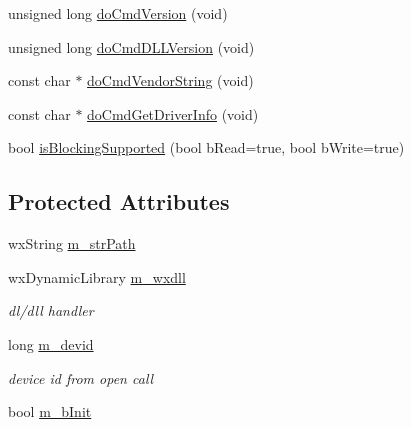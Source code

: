 \begin{DoxyCompactItemize}
unsigned long \hyperlink{class_c_dll_wrapper_a23f350d95cd15e82cd60cdddb90c3361}{doCmdVersion} (void)
\item 
unsigned long \hyperlink{class_c_dll_wrapper_ab2f4f9d4d403ee847442826234caf9d6}{doCmdDLLVersion} (void)
\item 
const char $\ast$ \hyperlink{class_c_dll_wrapper_a1d4f5113557b340ab21680376e76205e}{doCmdVendorString} (void)
\item 
const char $\ast$ \hyperlink{class_c_dll_wrapper_a74cef360f4a9e071260cd28f6dc92c69}{doCmdGetDriverInfo} (void)
\item 
bool \hyperlink{class_c_dll_wrapper_a504043dc80bfb6163cecbe0e2a0c48e1}{isBlockingSupported} (bool bRead=true, bool bWrite=true)
\end{DoxyCompactItemize}
\subsection*{Protected Attributes}
\begin{DoxyCompactItemize}
\item 
wxString \hyperlink{class_c_dll_wrapper_a07a318919ee7a2b0d6332bea947e4576}{m\_\-strPath}
\item 
\hypertarget{class_c_dll_wrapper_a07171bd633843c72899987d1e6a54ee3}{
wxDynamicLibrary \hyperlink{class_c_dll_wrapper_a07171bd633843c72899987d1e6a54ee3}{m\_\-wxdll}}
\label{de/d52/class_c_dll_wrapper_a07171bd633843c72899987d1e6a54ee3}

\begin{DoxyCompactList}\small\item\em dl/dll handler \end{DoxyCompactList}\item 
\hypertarget{class_c_dll_wrapper_a6f16be93eed366b6e545ccf469972f29}{
long \hyperlink{class_c_dll_wrapper_a6f16be93eed366b6e545ccf469972f29}{m\_\-devid}}
\label{de/d52/class_c_dll_wrapper_a6f16be93eed366b6e545ccf469972f29}

\begin{DoxyCompactList}\small\item\em device id from open call \end{DoxyCompactList}\item 
bool \hyperlink{class_c_dll_wrapper_a87469da2159181b270bf220a62f60d9d}{m\_\-bInit}
\end{DoxyCompactItemize}

